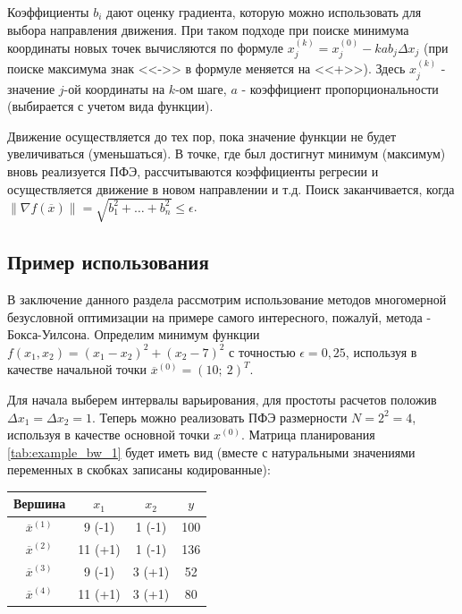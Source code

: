 \documentclass[a4paper,12pt]{report}
\begin{document}
Коэффициенты $b_{i}$ дают оценку градиента, которую можно использовать для выбора направления движения. При таком подходе при поиске минимума координаты новых точек вычисляются по формуле $x^{(k)}_{j} = x^{(0)}_{j} - kab_{j}\Delta x_{j}$ (при поиске максимума знак <<->> в формуле меняется на <<+>>). Здесь $x^{(k)}_{j}$ - значение $j$-ой координаты на $k$-ом шаге, $a$ - коэффициент пропорциональности (выбирается с учетом вида функции).

Движение осуществляется до тех пор, пока значение функции не будет увеличиваться (уменьшаться). В точке, где был достигнут минимум (максимум) вновь реализуется ПФЭ, рассчитываются коэффициенты регресии и осуществляется движение в новом направлении и т.д. Поиск заканчивается, когда $\left\|\nabla f(\overline{x})\right\| = \sqrt{b^{2}_{1} + \ldots + b^{2}_{n}} \leq \epsilon$.

\subsection{Пример использования}
В заключение данного раздела рассмотрим использование методов многомерной безусловной оптимизации на примере самого интересного, пожалуй, метода - Бокса-Уилсона. Определим минимум функции $f(x_{1}, x_{2}) = \left(x_{1} - x_{2}\right)^{2} + \left(x_{2} - 7\right)^{2}$ с точностью $\epsilon = 0,25$, используя в качестве начальной точки $\overline{x}^{(0)} = (10;\ 2)^{T}$.

Для начала выберем интервалы варьирования, для простоты расчетов положив $\Delta x_{1} = \Delta x_{2} = 1$. Теперь можно реализовать ПФЭ размерности $N = 2^{2} = 4$, используя в качестве основной точки $x^{(0)}$. Матрица планирования \ref{tab:example_bw_1} будет иметь вид (вместе с натуральными значениями переменных в скобках записаны кодированные):

\begin{center}
  \captionsetup{justification=raggedleft}
  \label{tab:example_bw_1}
  \begin{tabular}{|c|c|c|c|}
    \hline
    Вершина & $x_{1}$ & $x_{2}$ & $y$\\
    \hline
    $\overline{x}^{(1)}$ & 9 (-1) & 1 (-1) & 100\\
    \hline
    $\overline{x}^{(2)}$ & 11 (+1) & 1 (-1) & 136\\
    \hline
    $\overline{x}^{(3)}$ & 9 (-1) & 3 (+1) & 52\\
    \hline
    $\overline{x}^{(4)}$ & 11 (+1) & 3 (+1) & 80\\
    \hline
  \end{tabular}
\end{center}
\end{document}
